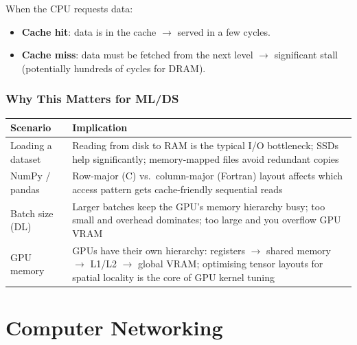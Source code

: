 \documentclass[oneside]{book}
\begin{document}
When the CPU requests data:
\begin{itemize}
    \item \textbf{Cache hit}: data is in the cache $\to$ served in a few cycles.
    \item \textbf{Cache miss}: data must be fetched from the next level
          $\to$ significant stall (potentially hundreds of cycles for DRAM).
\end{itemize}

\section{Why This Matters for ML/DS}


\begin{center}
\begin{tabularx}{\linewidth}{lX}
\toprule
\textbf{Scenario} & \textbf{Implication} \\
\midrule
Loading a dataset  & Reading from disk to RAM is the typical I/O bottleneck; SSDs
                     help significantly; memory-mapped files avoid redundant copies \\
NumPy / pandas     & Row-major (C) vs.\ column-major (Fortran) layout affects which
                     access pattern gets cache-friendly sequential reads \\
Batch size (DL)    & Larger batches keep the GPU's memory hierarchy busy; too small
                     and overhead dominates; too large and you overflow GPU VRAM \\
GPU memory         & GPUs have their own hierarchy: registers $\to$ shared memory
                     $\to$ L1/L2 $\to$ global VRAM; optimising tensor layouts for
                     spatial locality is the core of GPU kernel tuning \\
\bottomrule
\end{tabularx}
\end{center}

\part{Computer Networking}
\end{document}
